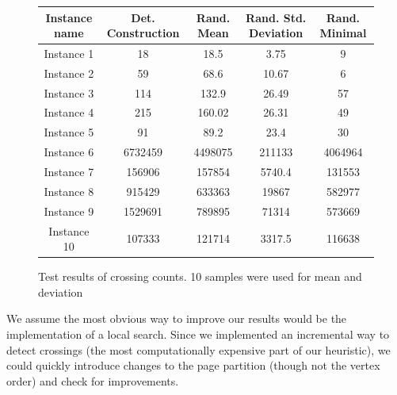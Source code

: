 \documentclass [11pt]{article}
\begin{document}
\begin{figure}[H]
\centering
  \begin{tabular}{| c | c | c | c | c |}
\hline
Instance name & Det. Construction & Rand. Mean & Rand. Std. Deviation & Rand. Minimal\\
\hline
Instance 1 & 18 & 18.5 & 3.75 & 9\\
\hline 
Instance 2 & 59 & 68.6 & 10.67 &6\\
\hline 
Instance 3 & 114 & 132.9 & 26.49 &57\\
\hline 
Instance 4 & 215 & 160.02 & 26.31 &49\\
\hline 
Instance 5 & 91 & 89.2  & 23.4 &30\\
\hline 
Instance 6 & 6732459 & 4498075 & 211133 &4064964\\
\hline 
Instance 7 & 156906 & 157854 & 5740.4 &  131553\\
\hline
Instance 8 & 915429 & 633363 & 19867 & 582977\\
\hline 
Instance 9 & 1529691 & 789895 & 71314 & 573669\\
\hline 
Instance 10 & 107333 & 121714 & 3317.5 &  116638\\
\hline 
\end{tabular}
\caption{Test results of crossing counts.  10 samples were used for mean and deviation}
\end{figure}




We assume the most obvious way to improve our results would be the implementation of a local search. Since we implemented an incremental way to detect crossings (the most computationally expensive part of our heuristic), we could quickly introduce changes to the page partition (though not the vertex order) and check for improvements. 
\end{document}
